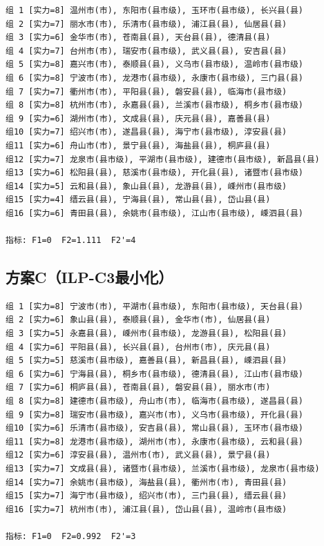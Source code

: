 \documentclass[12pt,a4paper]{article}
\begin{document}
{\small
\begin{verbatim}
组 1 [实力=8] 温州市(市), 东阳市(县市级), 玉环市(县市级), 长兴县(县)
组 2 [实力=7] 丽水市(市), 乐清市(县市级), 浦江县(县), 仙居县(县)
组 3 [实力=6] 金华市(市), 苍南县(县), 天台县(县), 德清县(县)
组 4 [实力=7] 台州市(市), 瑞安市(县市级), 武义县(县), 安吉县(县)
组 5 [实力=8] 嘉兴市(市), 泰顺县(县), 义乌市(县市级), 温岭市(县市级)
组 6 [实力=8] 宁波市(市), 龙港市(县市级), 永康市(县市级), 三门县(县)
组 7 [实力=7] 衢州市(市), 平阳县(县), 磐安县(县), 临海市(县市级)
组 8 [实力=8] 杭州市(市), 永嘉县(县), 兰溪市(县市级), 桐乡市(县市级)
组 9 [实力=6] 湖州市(市), 文成县(县), 庆元县(县), 嘉善县(县)
组10 [实力=7] 绍兴市(市), 遂昌县(县), 海宁市(县市级), 淳安县(县)
组11 [实力=6] 舟山市(市), 景宁县(县), 海盐县(县), 桐庐县(县)
组12 [实力=7] 龙泉市(县市级), 平湖市(县市级), 建德市(县市级), 新昌县(县)
组13 [实力=6] 松阳县(县), 慈溪市(县市级), 开化县(县), 诸暨市(县市级)
组14 [实力=5] 云和县(县), 象山县(县), 龙游县(县), 嵊州市(县市级)
组15 [实力=4] 缙云县(县), 宁海县(县), 常山县(县), 岱山县(县)
组16 [实力=6] 青田县(县), 余姚市(县市级), 江山市(县市级), 嵊泗县(县)

指标: F1=0  F2=1.111  F2'=4
\end{verbatim}
}

\subsection*{方案C（ILP-C3最小化）}

{\small
\begin{verbatim}
组 1 [实力=8] 宁波市(市), 平湖市(县市级), 东阳市(县市级), 天台县(县)
组 2 [实力=6] 象山县(县), 泰顺县(县), 金华市(市), 仙居县(县)
组 3 [实力=5] 永嘉县(县), 嵊州市(县市级), 龙游县(县), 松阳县(县)
组 4 [实力=6] 平阳县(县), 长兴县(县), 台州市(市), 庆元县(县)
组 5 [实力=5] 慈溪市(县市级), 嘉善县(县), 新昌县(县), 嵊泗县(县)
组 6 [实力=6] 宁海县(县), 桐乡市(县市级), 德清县(县), 江山市(县市级)
组 7 [实力=6] 桐庐县(县), 苍南县(县), 磐安县(县), 丽水市(市)
组 8 [实力=8] 建德市(县市级), 舟山市(市), 临海市(县市级), 遂昌县(县)
组 9 [实力=8] 瑞安市(县市级), 嘉兴市(市), 义乌市(县市级), 开化县(县)
组10 [实力=6] 乐清市(县市级), 安吉县(县), 常山县(县), 玉环市(县市级)
组11 [实力=8] 龙港市(县市级), 湖州市(市), 永康市(县市级), 云和县(县)
组12 [实力=6] 淳安县(县), 温州市(市), 武义县(县), 景宁县(县)
组13 [实力=7] 文成县(县), 诸暨市(县市级), 兰溪市(县市级), 龙泉市(县市级)
组14 [实力=7] 余姚市(县市级), 海盐县(县), 衢州市(市), 青田县(县)
组15 [实力=7] 海宁市(县市级), 绍兴市(市), 三门县(县), 缙云县(县)
组16 [实力=7] 杭州市(市), 浦江县(县), 岱山县(县), 温岭市(县市级)

指标: F1=0  F2=0.992  F2'=3
\end{verbatim}
}
\end{document}

